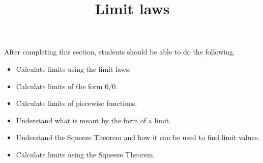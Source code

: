 \documentclass{ximera}
\title{Limit laws}
\begin{document}
\begin{abstract}
\end{abstract}

\maketitle

\begin{sectionOutcomes}
After completing this section, students should be able to do the following.

\begin{itemize}
	\item Calculate limits using the limit laws.
	\item Calculate limits of the form $0/0$.
	\item Calculate limits of piecewise functions.
	\item Understand what is meant by the form of a limit.
	\item Understand the Squeeze Theorem and how it can be used to find limit values.
	\item Calculate limits using the Squeeze Theorem.
\end{itemize}
\end{sectionOutcomes}
\end{document}
